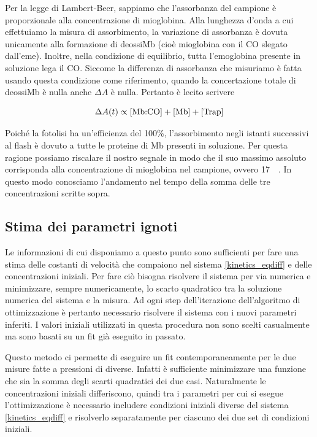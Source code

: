 \documentclass[11pt, a4paper]{article}
\begin{document}

Per la legge di Lambert-Beer, sappiamo che l'assorbanza del campione è proporzionale alla concentrazione di mioglobina.
Alla lunghezza d'onda a cui effettuiamo la misura di assorbimento, la variazione di assorbanza è dovuta unicamente alla formazione di deossiMb (cioè mioglobina con il CO slegato dall'eme). Inoltre, nella condizione di equilibrio,
tutta l'emoglobina presente in soluzione lega il CO. Siccome la differenza di assorbanza che misuriamo è fatta usando questa condizione come riferimento, quando la concertazione totale di deossiMb è nulla anche $\Delta A$ è nulla.
Pertanto è lecito scrivere

\[\Delta A(t) \propto \ce{[Mb{:}CO]} + \ce{[Mb]} + \ce{[Trap]} \]

Poiché la fotolisi ha un'efficienza del 100\%, l'assorbimento negli istanti successivi al flash è dovuto a tutte le proteine di Mb presenti in soluzione. Per questa ragione possiamo riscalare il nostro segnale
in modo che il suo massimo assoluto corrisponda alla concentrazione di mioglobina nel campione, ovvero \qty{17}{\micro\molar}.
In questo modo conosciamo l'andamento nel tempo della somma delle tre concentrazioni scritte sopra.

\subsection{Stima dei parametri ignoti}
Le informazioni di cui disponiamo a questo punto sono sufficienti per fare una stima delle costanti di velocità che compaiono nel sistema \eqref{kinetics_eqdiff} e delle concentrazioni iniziali.
Per fare ciò bisogna risolvere il sistema per via numerica e minimizzare, sempre numericamente, lo scarto quadratico tra la soluzione numerica del sistema e la misura.
Ad ogni step dell'iterazione dell'algoritmo di ottimizzazione è pertanto necessario risolvere il sistema con i nuovi parametri inferiti.
I valori iniziali utilizzati in questa procedura non sono scelti casualmente ma sono basati su un fit già eseguito in passato.

Questo metodo ci permette di eseguire un fit contemporaneamente per le due misure fatte a pressioni di  diverse.
Infatti è sufficiente minimizzare una funzione che sia la somma degli scarti quadratici dei due casi.
Naturalmente le concentrazioni iniziali differiscono, quindi tra i parametri per cui si esegue l'ottimizzazione è necessario includere
condizioni iniziali diverse del sistema \eqref{kinetics_eqdiff} e risolverlo separatamente per ciascuno dei due set di condizioni iniziali.
\end{document}
